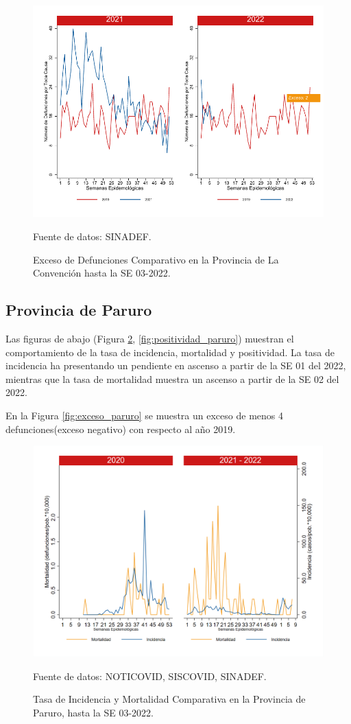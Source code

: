 \documentclass[12pt,a4paper,openany]{book}
\begin{document}
		\begin{figure}[h]
			\caption{Exceso de Defunciones Comparativo en la Provincia de La Convención hasta la SE 03-2022.}\label{fig:exceso_laconv}
			\begin{center}
				\includegraphics[width=0.7\linewidth]{../figuras/exceso_9.pdf}
			\end{center}
			{\footnotesize {Fuente de datos: SINADEF.}}
		\end{figure}
		
		\clearpage
		
		\subsection*{Provincia de Paruro}
		\noindent Las figuras de abajo (Figura \ref{fig:inc_mort_paruro}, \ref{fig:positividad_paruro}) muestran el comportamiento de la tasa de incidencia, mortalidad y positividad. La tasa de incidencia ha presentando un pendiente en ascenso a partir de la SE 01 del 2022, mientras que la tasa de mortalidad muestra un ascenso a partir de la SE 02 del 2022.  
	 
	 En la Figura \ref{fig:exceso_paruro} se muestra un exceso de menos 4 defunciones(exceso negativo) con respecto al año 2019.
		
		\begin{figure}[h]
			\caption{Tasa de Incidencia y Mortalidad Comparativa en la Provincia de Paruro, hasta la SE 03-2022.}\label{fig:inc_mort_paruro}
			\begin{center}
				\includegraphics[width=0.7\linewidth]{../figuras/incidencia_mortalidad_20_21_10.png}
			\end{center}
			{\footnotesize {Fuente de datos: NOTICOVID, SISCOVID, SINADEF.}} 
		\end{figure}
		
\end{document}
